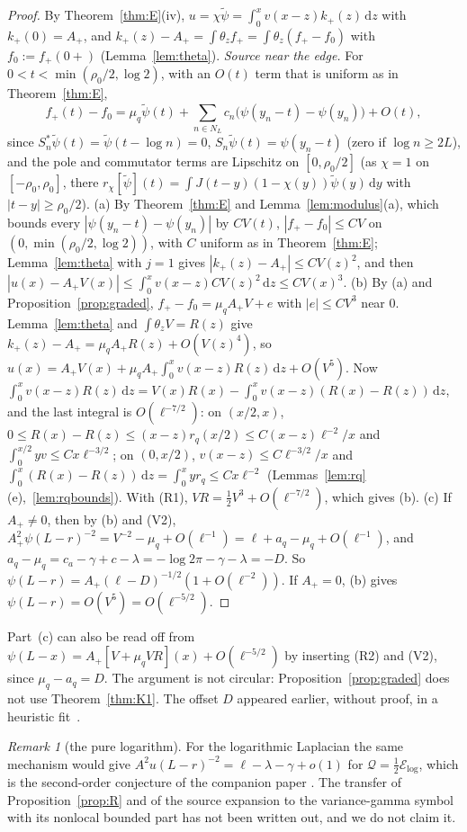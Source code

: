\documentclass[11pt]{amsart}
\newcommand{\cE}{\mathcal{E}}
\newcommand{\cQ}{\mathcal{Q}}
\newcommand{\dd}{\,\mathrm{d}}
\theoremstyle{definition}
\theoremstyle{remark}
\newtheorem{remark}[theorem]{Remark}
\numberwithin{equation}{section}
\begin{document}
\begin{proof}
By Theorem~\ref{thm:E}(iv), $u=\chi\tilde\psi=\int_0^xv(x-z)k_+(z)\dd z$ with $k_+(0)=A_+$, and $k_+(z)-A_+=\int\theta_zf_+=\int\theta_z(f_+-f_0)$ with $f_0:=f_+(0+)$ (Lemma~\ref{lem:theta}).
\emph{Source near the edge.} For $0<t<\min(\rho_0/2,\log2)$, with an $O(t)$ term that is uniform as in Theorem~\ref{thm:E},
\[
f_+(t)-f_0=\mu_q\tilde\psi(t)+\sum_{n\in N_L}c_n\bigl(\psi(y_n-t)-\psi(y_n)\bigr)+O(t),
\]
since $S_n^*\tilde\psi(t)=\tilde\psi(t-\log n)=0$, $S_n\tilde\psi(t)=\psi(y_n-t)$ (zero if $\log n\ge2L$), and the pole and commutator terms are Lipschitz on $[0,\rho_0/2]$ (as $\chi=1$ on $[-\rho_0,\rho_0]$, there $r_\chi[\tilde\psi](t)=\int J(t-y)(1-\chi(y))\tilde\psi(y)\dd y$ with $|t-y|\ge\rho_0/2$).
(a) By Theorem~\ref{thm:E} and Lemma~\ref{lem:modulus}(a), which bounds every $|\psi(y_n-t)-\psi(y_n)|$ by $CV(t)$, $|f_+-f_0|\le CV$ on $(0,\min(\rho_0/2,\log2))$, with $C$ uniform as in Theorem~\ref{thm:E}; Lemma~\ref{lem:theta} with $j=1$ gives $|k_+(z)-A_+|\le CV(z)^2$, and then $|u(x)-A_+V(x)|\le\int_0^xv(x-z)CV(z)^2\dd z\le CV(x)^3$.
(b) By (a) and Proposition~\ref{prop:graded}, $f_+-f_0=\mu_qA_+V+e$ with $|e|\le CV^3$ near $0$. Lemma~\ref{lem:theta} and $\int\theta_zV=R(z)$ give $k_+(z)-A_+=\mu_qA_+R(z)+O(V(z)^4)$, so $u(x)=A_+V(x)+\mu_qA_+\int_0^xv(x-z)R(z)\dd z+O(V^5)$. Now $\int_0^xv(x-z)R(z)\dd z=V(x)R(x)-\int_0^xv(x-z)(R(x)-R(z))\dd z$, and the last integral is $O(\ell^{-7/2})$: on $(x/2,x)$, $0\le R(x)-R(z)\le(x-z)r_q(x/2)\le C(x-z)\ell^{-2}/x$ and $\int_0^{x/2}yv\le Cx\ell^{-3/2}$; on $(0,x/2)$, $v(x-z)\le C\ell^{-3/2}/x$ and $\int_0^x(R(x)-R(z))\dd z=\int_0^xyr_q\le Cx\ell^{-2}$ (Lemmas~\ref{lem:rq}(e),~\ref{lem:rqbounds}). With (R1), $VR=\frac12V^3+O(\ell^{-7/2})$, which gives (b).
(c) If $A_+\ne0$, then by (b) and (V2), $A_+^2\psi(L-r)^{-2}=V^{-2}-\mu_q+O(\ell^{-1})=\ell+a_q-\mu_q+O(\ell^{-1})$, and $a_q-\mu_q=c_a-\gamma+c-\lambda=-\log2\pi-\gamma-\lambda=-D$. So $\psi(L-r)=A_+(\ell-D)^{-1/2}(1+O(\ell^{-2}))$. If $A_+=0$, (b) gives $\psi(L-r)=O(V^5)=O(\ell^{-5/2})$.
\end{proof}

Part~(c) can also be read off from $\psi(L-x)=A_+[V+\mu_qVR](x)+O(\ell^{-5/2})$ by inserting (R2) and (V2), since $\mu_q-a_q=D$. The argument is not circular: Proposition~\ref{prop:graded} does not use Theorem~\ref{thm:K1}. The offset $D$ appeared earlier, without proof, in a heuristic fit~\cite{SoDb}.

\begin{remark}[the pure logarithm]\label{rem:purelog}
For the logarithmic Laplacian the same mechanism would give $A^2u(L-r)^{-2}=\ell-\lambda-\gamma+o(1)$ for $\cQ=\frac12\cE_{\log}$, which is the second-order conjecture of the companion paper \cite[Conj.~9.2]{BPL}. The transfer of Proposition~\ref{prop:R} and of the source expansion to the variance-gamma symbol with its nonlocal bounded part has not been written out, and we do not claim it.
\end{remark}
\end{document}

